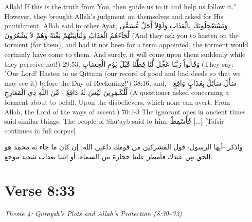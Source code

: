 \documentclass[11pt,a4paper,openany]{book}
\let\textAR\textarabic
\begin{document}
\begin{tafsirbox}
Allah! If this is the truth from You, then guide us to it and help us follow it." However, they brought Allah's judgment on themselves and asked for His punishment. Allah said in other Ayat, \textAR{وَيَسْتَعْجِلُونَكَ} \textAR{بِالْعَذَابِ} \textAR{وَلَوْلاَ} \textAR{أَجَلٌ} \textAR{مُّسَمًّى} \textAR{لَّجَآءَهُمُ} \textAR{الْعَذَابُ} \textAR{وَلَيَأْتِيَنَّهُمْ} \textAR{بَغْتَةً} \textAR{وَهُمْ} \textAR{لاَ} \textAR{يَشْعُرُونَ} (And they ask you to hasten on the torment (for them), and had it not been for a term appointed, the torment would certainly have come to them. And surely, it will come upon them suddenly while they perceive not!) 29:53, \textAR{وَقَالُواْ} \textAR{رَبَّنَا} \textAR{عَجِّل} \textAR{لَّنَا} \textAR{قِطَّنَا} \textAR{قَبْلَ} \textAR{يَوْمِ} \textAR{الْحِسَابِ} (They say: "Our Lord! Hasten to us Qittana (our record of good and bad deeds so that we may see it) before the Day of Reckoning!") 38:16, and, \textAR{سَأَلَ} \textAR{سَآئِلٌ} \textAR{بِعَذَابٍ} \textAR{وَاقِعٍ} - \textAR{لِّلْكَـفِرِينَ} \textAR{لَيْسَ} \textAR{لَهُ} \textAR{دَافِعٌ} - \textAR{مِّنَ} \textAR{اللَّهِ} \textAR{ذِي} \textAR{الْمَعَارِجِ} (A questioner asked concerning a torment about to befall. Upon the disbelievers, which none can avert. From Allah, the Lord of the ways of ascent.) 70:1-3 The ignorant ones in ancient times said similar things. The people of Shu`ayb said to him, \textAR{فَأَسْقِطْ}  [...] [Tafsir continues in full corpus]
\end{tafsirbox}


\begin{muyassarbox}
\textAR{واذكر -أيها الرسول- قول المشركين من قومك داعين الله: إن كان ما جاء به محمد هو الحق مِن عندك فأمطر علينا حجارة من السماء، أو ائتنا بعذاب شديد موجع.}
\end{muyassarbox}


\newpage

\section{Verse 8:33}
{\small\color{accent2}\itshape Theme 4: Quraysh's Plots and Allah's Protection (8:30--33)}
\end{document}
